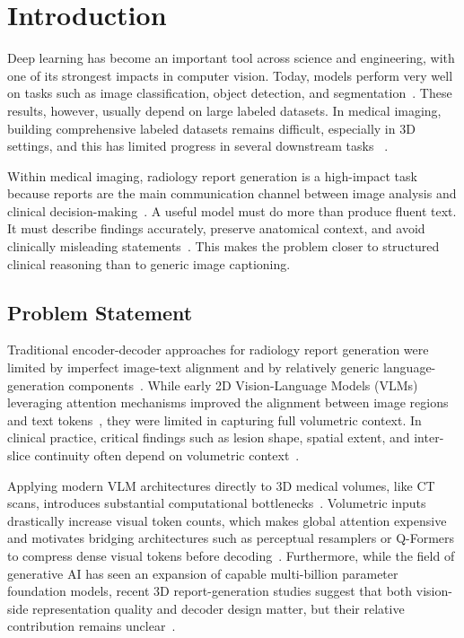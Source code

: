 
\chapter{Introduction}\label{chapter:introduction}
Deep learning has become an important tool across science and engineering, with one of its strongest impacts in computer vision. Today, models perform very well on tasks such as image classification, object detection, and segmentation~\cite{liu2021swin}. These results, however, usually depend on large labeled datasets. In medical imaging, building comprehensive labeled datasets remains difficult, especially in 3D settings, and this has limited progress in several downstream tasks ~\cite{hamamci2024foundation}.

Within medical imaging, radiology report generation is a high-impact task because reports are the main communication channel between image analysis and clinical decision-making~\cite{wang2025rrgsurvey}. A useful model must do more than produce fluent text. It must describe findings accurately, preserve anatomical context, and avoid clinically misleading statements~\cite{ostmeier2024green}. This makes the problem closer to structured clinical reasoning than to generic image captioning.

\section{Problem Statement}
Traditional encoder-decoder approaches for radiology report generation were limited by imperfect image-text alignment and by relatively generic language-generation components~\cite{chen2020generating}. While early 2D Vision-Language Models (VLMs) leveraging attention mechanisms improved the alignment between image regions and text tokens~\cite{chen2022crossmodal}, they were limited in capturing full volumetric context. In clinical practice, critical findings such as lesion shape, spatial extent, and inter-slice continuity often depend on volumetric context~\cite{hatamizadeh2022unetr}. 

Applying modern VLM architectures directly to 3D medical volumes, like CT scans, introduces substantial computational bottlenecks~\cite{hamamci2024ct2rep,hamamci2025bettertokensbetter3d}. Volumetric inputs drastically increase visual token counts, which makes global attention expensive and motivates bridging architectures such as perceptual resamplers or Q-Formers to compress dense visual tokens before decoding~\cite{alayrac2022flamingo,li2023blip2}. Furthermore, while the field of generative \ac{AI} has seen an expansion of capable multi-billion parameter foundation models, recent 3D report-generation studies suggest that both vision-side representation quality and decoder design matter, but their relative contribution remains unclear~\cite{argus2024}.


